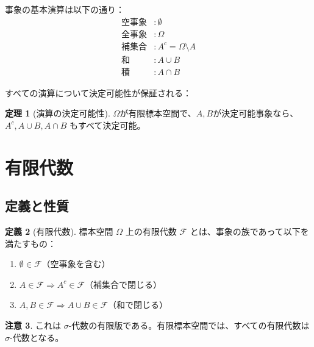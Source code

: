 \documentclass[a4paper,12pt]{ltjsarticle}
\theoremstyle{definition}
\newtheorem{definition}{定義}[section]
\newtheorem{theorem}[definition]{定理}
\newtheorem{remark}[definition]{注意}
\begin{document}
事象の基本演算は以下の通り：
\begin{align*}
\text{空事象} &: \emptyset \\
\text{全事象} &: \Omega \\
\text{補集合} &: A^c = \Omega \setminus A \\
\text{和} &: A \cup B \\
\text{積} &: A \cap B
\end{align*}

すべての演算について決定可能性が保証される：

\begin{theorem}[演算の決定可能性]
$\Omega$が有限標本空間で、$A, B$が決定可能事象なら、
$A^c, A \cup B, A \cap B$ もすべて決定可能。
\end{theorem}

\begin{center}
\end{center}

\section{有限代数}

\subsection{定義と性質}

\begin{definition}[有限代数]
標本空間 $\Omega$ 上の有限代数 $\mathcal{F}$ とは、事象の族であって以下を満たすもの：
\begin{enumerate}
\item $\emptyset \in \mathcal{F}$（空事象を含む）
\item $A \in \mathcal{F} \Rightarrow A^c \in \mathcal{F}$（補集合で閉じる）
\item $A, B \in \mathcal{F} \Rightarrow A \cup B \in \mathcal{F}$（和で閉じる）
\end{enumerate}
\end{definition}

\begin{remark}
これは $\sigma$-代数の有限版である。有限標本空間では、すべての有限代数は $\sigma$-代数となる。
\end{remark}
\end{document}
